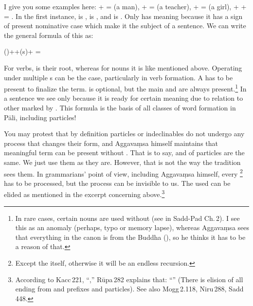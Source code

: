 I give you some examples here:  +  =  (a man),  +  =  (a teacher),  +  =  (a girl),  +  +  = . In the first instance,  is ,  is , and  is . Only  has meaning because it has a sign of present nominative case which make it the subject of a sentence. We can write the general formula of this as:

\begingroup
\large
\medskip
()++(s)+ = 
\medskip
\endgroup

For verbs,  is their root, whereas for nouns it is  like  mentioned above. Operating under multiple s can be the case, particularly in verb formation. A  has to be present to finalize the term.  is optional, but the main  and  are always present.\footnote{In rare cases, certain nouns are used without  (see  in Sadd-Pad Ch.\,2). I see this as an anomaly (perhaps, typo or memory lapse), whereas Aggava\d msa sees that everything in the canon is from the Buddha (), so he thinks it has to be a reason of that.} In a sentence we see only  because it is ready for certain meaning due to relation to other  marked by . This formula is the basis of all classes of word formation in P\=ali, including particles!

You may protest that by definition particles or indeclinables do not undergo any process that changes their form, and Aggava\d msa himself maintains that meaningful term can be present without . That is to say,  and  of particles are the same. We just use them as they are. However, that is not the way the tradition sees them. In grammarians' point of view, including Aggava\d msa himself, every \footnote{Except the  itself, otherwise it will be an endless recursion.} has to be processed, but the process can be invisible to us. The  used can be elided as mentioned in the excerpt concerning  above.\footnote{According to Kacc\,221, ``,'' R\=upa\,282 explains that: ``'' (There is elision of all ending  from  and prefixes and particles). See also Mogg\,2.118, Niru\,288, Sadd\,448.}

